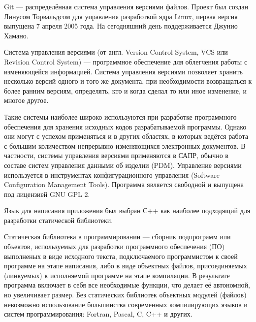 Git — распределённая система управления версиями файлов. Проект был создан Линусом Торвальдсом для управления разработкой ядра Linux, первая версия выпущена 7 апреля 2005 года. На сегодняшний день поддерживается Джунио Хамано.

Система управления версиями (от англ. Version Control System, VCS или Revision Control System) — программное обеспечение для облегчения работы с изменяющейся информацией. Система управления версиями позволяет хранить несколько версий одного и того же документа, при необходимости возвращаться к более ранним версиям, определять, кто и когда сделал то или иное изменение, и многое другое.

Такие системы наиболее широко используются при разработке программного обеспечения для хранения исходных кодов разрабатываемой программы. Однако они могут с успехом применяться и в других областях, в которых ведётся работа с большим количеством непрерывно изменяющихся электронных документов. В частности, системы управления версиями применяются в САПР, обычно в составе систем управления данными об изделии (PDM). Управление версиями используется в инструментах конфигурационного управления (Software Configuration Management Tools).
Программа является свободной и выпущена под лицензией GNU GPL 2.

Язык для написания приложения был выбран С++ как наиболее подходящий для разработки статической библиотеки.

Статическая библиотека в программировании — сборник подпрограмм или объектов, используемых для разработки программного обеспечения (ПО) выполненых в виде исходного текста, подключаемого программистом к своей программе на этапе написания, либо в виде объектных файлов, присоединяемых (линкуемых) к исполняемой программе на этапе компиляции. В результате программа включает в себя все необходимые функции, что делает её автономной, но увеличивает размер. Без статических библиотек объектных модулей (файлов) невозможно использование большинства современных компилирующих языков и систем программирования: Fortran, Pascal, C, C++ и других.












